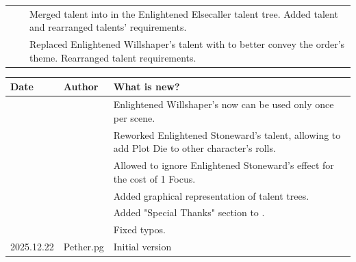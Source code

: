 \begin{tabular}{p{1.7cm} p{1.7cm} p{13cm}}
	&& \color{black} Merged \talentElsecallerRangeName{} talent into \talentElsecallerMistyStepName{} in the Enlightened Elsecaller talent tree. Added \talentElsecallerStealLightName{} talent and rearranged talents' requirements. \\
	
	&& \color{black} Replaced Enlightened Willshaper's \talentWillshaperFreeMoveName{} talent with \talentWillshaperAlcoholName{} to better convey the order's theme.  Rearranged talent requirements.\\
	
\end{tabular}
\newpage
\noindent
\begin{tabular}{p{1.7cm} p{1.7cm} p{13cm}}
	
	Date & Author & What is new? \\ \hline
	
	&& \color{black} Enlightened Willshaper's \talentWillshaperFiremossName{} now can be used only once per scene. \\
	
	&& \color{black} Reworked Enlightened Stoneward's \talentStonewardAddOthersPlotName{} talent, allowing to add Plot Die to other character's rolls. \\
	
	&& \color{black} Allowed to ignore Enlightened Stoneward's \talentStonewardDisadvantageOthersName{} effect for the cost of 1 Focus. \\
	
	&& \color{black} Added graphical representation of talent trees.  \\
	
	&& \color{black} Added "Special Thanks" section to \fullref{sec:corruptedRulesAcknowledgments}. \\
	
	&& \color{black} Fixed typos. \\ 
	\hline
	
	\color{black} 2025.12.22 
	& \color{black} Pether.pg 
	& \color{black} Initial version	\\ 
	\hline 

\end{tabular}

\normalsize
\twocolumn

